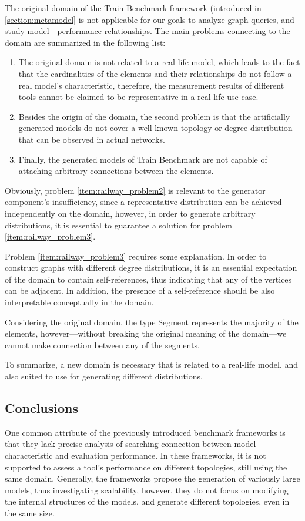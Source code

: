 The original domain of the Train Benchmark framework (introduced in \ref{section:metamodel} is not applicable for our goals to analyze graph queries, and study model - performance relationships. The main problems connecting to the domain are summarized in the following list:
\begin{enumerate}
	\item The original domain is not related to a real-life model, which leads to the fact that the cardinalities of the elements and their relationships do not follow a real model's characteristic, therefore, the measurement results of different tools cannot be claimed to be representative in a real-life use case. \label{item:railway_problem1}
	\item Besides the origin of the domain, the second problem is that the artificially generated models do not cover a well-known topology or degree distribution that can be observed in actual networks. \label{item:railway_problem2}
	\item Finally, the generated models of Train Benchmark are not capable of attaching arbitrary connections between the elements. \label{item:railway_problem3}
\end{enumerate}

Obviously, problem \ref{item:railway_problem2} is relevant to the generator component's insufficiency, since a representative distribution can be achieved independently on the domain, however, in order to generate arbitrary distributions, it is essential to guarantee a solution for problem \ref{item:railway_problem3}.

Problem \ref{item:railway_problem3} requires some explanation. In order to construct graphs with different degree distributions, it is an essential expectation of the domain to contain self-references, thus indicating that any of the vertices can be adjacent. In addition, the presence of a self-reference should be also interpretable conceptually in the domain. 

Considering the original domain, the type \textsf{Segment} represents the majority of the elements, however---without breaking the original meaning of the domain---we cannot make connection between any of the segments.


To summarize, a new domain is necessary that is related to a real-life model, and also suited to use for generating different distributions.


\subsection{Conclusions} \label{sec:benchmark_conclusions}

One common attribute of the previously introduced benchmark frameworks is that they lack precise analysis of searching connection between model characteristic and evaluation performance. In these frameworks, it is not supported to assess a tool's performance on different topologies, still using the same domain. Generally, the frameworks propose the generation of variously large models, thus investigating scalability, however, they do not focus on modifying the internal structures of the models, and generate different topologies, even in the same size.

